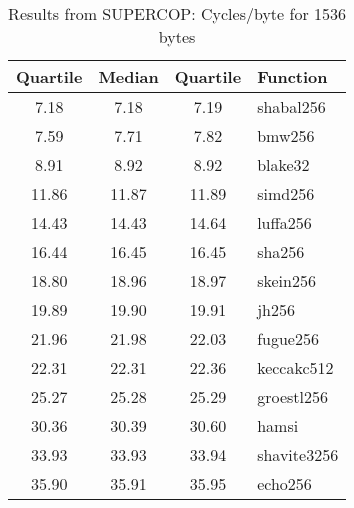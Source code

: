 \begin{table}
  \centering
  \begin{tabular}{ | c | c | c | l | }
    \hline
    \textbf{Quartile} & \textbf{Median} & \textbf{Quartile} & \textbf{Function} \\ \hline
    7.18 & 7.18 & 7.19 & shabal256 \\ \hline
    7.59 & 7.71 & 7.82 & bmw256 \\ \hline
    8.91 & 8.92 & 8.92 & blake32 \\ \hline
    11.86 & 11.87 & 11.89 & simd256 \\ \hline
    14.43 & 14.43 & 14.64 & luffa256 \\ \hline
    16.44 & 16.45 & 16.45 & sha256 \\ \hline
    18.80 & 18.96 & 18.97 & skein256 \\ \hline
    19.89 & 19.90 & 19.91 & jh256 \\ \hline
    21.96 & 21.98 & 22.03 & fugue256 \\ \hline
    22.31 & 22.31 & 22.36 & keccakc512 \\ \hline
    25.27 & 25.28 & 25.29 & groestl256 \\ \hline
    30.36 & 30.39 & 30.60 & hamsi \\ \hline
    33.93 & 33.93 & 33.94 & shavite3256 \\ \hline
    35.90 & 35.91 & 35.95 & echo256 \\ \hline
  \end{tabular}
  \caption{Results from SUPERCOP: Cycles/byte for 1536 bytes}
  \label{tbl:supercop:1536}
\end{table}
